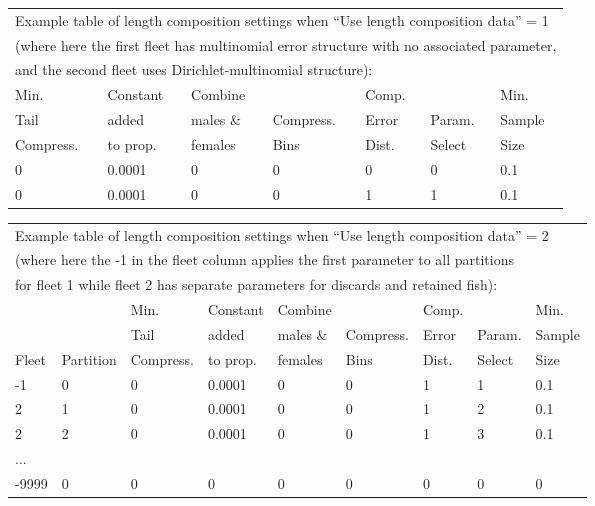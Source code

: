 \begin{tabular}{p{2cm} p{2cm} p{2cm} p{2cm} p{2cm} p{1.5cm} p{1.5cm}}
	\multicolumn{7}{l}{Example table of length composition settings when ``Use length composition data'' = 1} \\
	\multicolumn{7}{l}{(where here the first fleet has multinomial error structure with no associated parameter,} \\ 
	\multicolumn{7}{l}{and the second fleet uses Dirichlet-multinomial structure):} \\
	\hline
	Min.      & Constant & Combine  &           & Comp. &        & Min. \Tstrut\\
	Tail      & added    & males \& & Compress. & Error & Param. & Sample \\
	Compress. & to prop. & females  & Bins      & Dist. & Select & Size \Bstrut\\
	\hline
	0 & 0.0001 & 0 & 0 & 0 & 0 & 0.1 \Tstrut\\
	0 & 0.0001 & 0 & 0 & 1 & 1 & 0.1 \Bstrut\\
	\hline
\end{tabular}
\leavevmode\tagmcend\tagstructend\par

\begin{tabular}{p{1cm} p{1.5cm} p{1.75cm} p{1.5cm} p{1.5cm} p{1.75cm} p{1.25cm} p{1.25cm} p{1.5cm}}
	\multicolumn{9}{l}{Example table of length composition settings when ``Use length composition data'' = 2}\\
	\multicolumn{9}{l}{(where here the -1 in the fleet column applies the first parameter to all partitions} \\
	\multicolumn{9}{l}{for fleet 1 while fleet 2 has separate parameters for discards and retained fish):} \\
	\hline
	        &           & Min.      & Constant & Combine  &           & Comp. &        & Min. \Tstrut\\
	        &           & Tail      & added    & males \& & Compress. & Error & Param. & Sample \\
	Fleet   & Partition & Compress. & to prop. & females  & Bins      & Dist. & Select & Size \Bstrut\\
	\hline
	-1 & 0 & 0 & 0.0001 & 0 & 0 & 1 & 1 & 0.1 \Tstrut\\
	2 & 1 & 0 & 0.0001 & 0 & 0 & 1 & 2 & 0.1 \\
	2 & 2 & 0 & 0.0001 & 0 & 0 & 1 & 3 & 0.1 \\
	... &  &  &        &   &   &   &   &  \\
	-9999 & 0 & 0 & 0 & 0 & 0 & 0 & 0 & 0 \Bstrut\\
	\hline
\end{tabular}
\leavevmode\tagmcend\tagstructend\par

